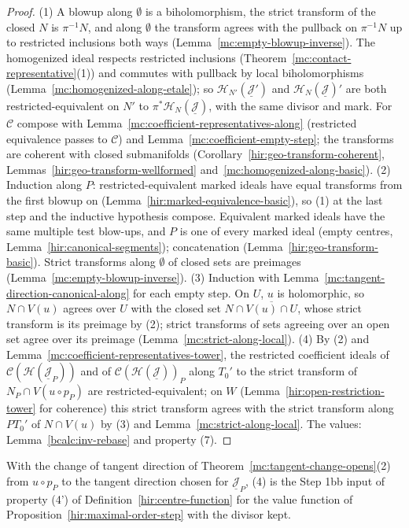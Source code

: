 \begin{proof}
\leanok
(1) A blowup along \(\emptyset\) is a biholomorphism, the strict transform of the closed \(N\) is \(\pi^{-1}N\), and along \(\emptyset\) the transform agrees with the pullback on
\(\pi^{-1}N\) up to restricted inclusions both ways (Lemma~\ref{mc:empty-blowup-inverse}). The homogenized ideal respects restricted inclusions
(Theorem~\ref{mc:contact-representative}(1)) and commutes with pullback by local biholomorphisms (Lemma~\ref{mc:homogenized-along-etale}); so \(\mathcal H_{N'}(\underline{\mathcal J}')\)
and \(\mathcal H_N(\underline{\mathcal J})'\) are both restricted-equivalent on \(N'\) to \(\pi^*\mathcal H_N(\underline{\mathcal J})\), with the same divisor and mark. For \(\mathcal C\)
compose with Lemma~\ref{mc:coefficient-representatives-along} (restricted equivalence passes to \(\mathcal C\)) and Lemma~\ref{mc:coefficient-empty-step}; the transforms are coherent with
closed submanifolds (Corollary~\ref{hir:geo-transform-coherent}, Lemmas~\ref{hir:geo-transform-wellformed} and~\ref{mc:homogenized-along-basic}).
(2) Induction along \(P\): restricted-equivalent marked ideals have equal transforms from the first blowup on (Lemma~\ref{hir:marked-equivalence-basic}), so (1) at the last step and the
inductive hypothesis compose. Equivalent marked ideals have the same multiple test blow-ups, and \(P\) is one of every marked ideal (empty centres,
Lemma~\ref{hir:canonical-segments}); concatenation (Lemma~\ref{hir:geo-transform-basic}). Strict transforms along \(\emptyset\) of closed sets are preimages
(Lemma~\ref{mc:empty-blowup-inverse}).
(3) Induction with Lemma~\ref{mc:tangent-direction-canonical-along} for each empty step. On \(U\), \(u\) is holomorphic, so \(N\cap V(u)\) agrees over \(U\) with the closed set
\(N\cap\overline{V(u)\cap U}\), whose strict transform is its preimage by (2); strict transforms of sets agreeing over an open set agree over its preimage
(Lemma~\ref{mc:strict-along-local}).
(4) By (2) and Lemma~\ref{mc:coefficient-representatives-tower}, the restricted coefficient ideals of \(\mathcal C(\mathcal H(\underline{\mathcal J}_P))\) and of
\(\mathcal C(\mathcal H(\underline{\mathcal J}))_P\) along \(T_0'\) to the strict transform of \(N_P\cap V(u\circ p_P)\) are restricted-equivalent; on \(W\) (Lemma~\ref{hir:open-restriction-tower}
for coherence) this strict transform agrees with the strict transform along \(PT_0'\) of \(N\cap V(u)\) by (3) and Lemma~\ref{mc:strict-along-local}. The values: Lemma~\ref{bcalc:inv-rebase}
and property (7).
\end{proof}
With the change of tangent direction of Theorem~\ref{mc:tangent-change-opens}(2) from \(u\circ p_P\) to the tangent direction chosen for \(\underline{\mathcal J}_P\), (4) is the Step 1bb input of
property (4') of Definition~\ref{hir:centre-function} for the value function of Proposition~\ref{hir:maximal-order-step} with the divisor kept.

